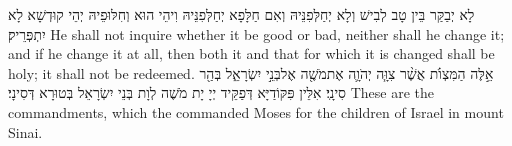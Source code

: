 {לָא יְבַקַּר בֵּין טָב לְבִישׁ וְלָא יְחַלְּפִנֵּיהּ וְאִם חַלָּפָא יְחַלְּפִנֵּיהּ וִיהֵי הוּא וְחִלּוּפֵיהּ יְהֵי קוּדְשָׁא לָא יִתְפְּרֵיק׃}
{He shall not inquire whether it be good or bad, neither shall he change it; and if he change it at all, then both it and that for which it is changed shall be holy; it shall not be redeemed.}{}
{אֵ֣לֶּה הַמִּצְוֺ֗ת אֲשֶׁ֨ר צִוָּ֧ה יְהֹוָ֛ה אֶת\maqqaf מֹשֶׁ֖ה אֶל\maqqaf בְּנֵ֣י יִשְׂרָאֵ֑ל בְּהַ֖ר סִינָֽי׃}
{אִלֵּין פִּקּוֹדַיָּא דְּפַקֵּיד יְיָ יָת מֹשֶׁה לְוָת בְּנֵי יִשְׂרָאֵל בְּטוּרָא דְּסִינָי׃}
{These are the commandments, which the \lord\space commanded Moses for the children of Israel in mount Sinai.}{}

\newperek
\chazak
